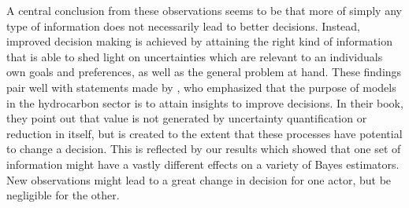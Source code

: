 	A central conclusion from these observations seems to be that more of simply any type of information does not necessarily lead to better decisions. Instead, improved decision making is achieved by attaining the right kind of information that is able to shed light on uncertainties which are relevant to an individuals own goals and preferences, as well as the general problem at hand. These findings pair well with statements made by \citet{bratvold2010making}, who emphasized that the purpose of models in the hydrocarbon sector is to attain insights to improve decisions. In their book, they point out that value is not generated by uncertainty quantification or reduction in itself, but is created to the extent that these processes have potential to change a decision. This is reflected by our results which showed that one set of information might have a vastly different effects on a variety of Bayes estimators. New observations might lead to a great change in decision for one actor, but be negligible for the other.	

